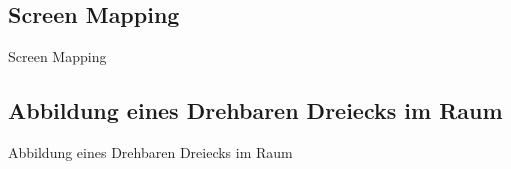 \documentclass[10pt,aspectratio=169]{beamer}
\begin{document}
  \subsection{Screen Mapping}
  \begin{frame}{Screen Mapping}
  \end{frame}

  \subsection{Abbildung eines Drehbaren Dreiecks im Raum}
  \begin{frame}{Abbildung eines Drehbaren Dreiecks im Raum}
  \end{frame}
\end{document}
